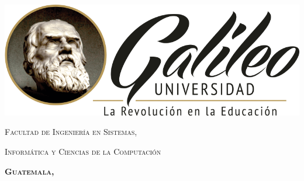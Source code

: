 \documentclass[
12pt, %
spanish, %
doublespacing, %
liststotoc, %
parskip, %
headsepline, %
]{MastersDoctoralThesis} %
\author{José Jacobo \textsc{Del Valle Girón}} %
\begin{document}
\frontmatter %

\pagestyle{plain} %


\begin{titlepage}
\begin{center}

\begingroup\onehalfspacing

{\scshape\LARGE \authorname\par}\vspace{1.5cm} %

{\huge \bfseries \ttitle\par} %

\vspace{1.5cm}

\includegraphics[scale=0.5]{logo.png} %

\vspace{1.5cm}

{\scshape\Large \univname\par} %
{\scshape\Large Facultad de Ingeniería en Sistemas,}
{\scshape\Large Informática y Ciencias de la Computación\par}

{\scshape \Large \bfseries Guatemala, \the\year \par}

\endgroup
 
\vfill
\end{center}
\end{titlepage}

\end{document}
